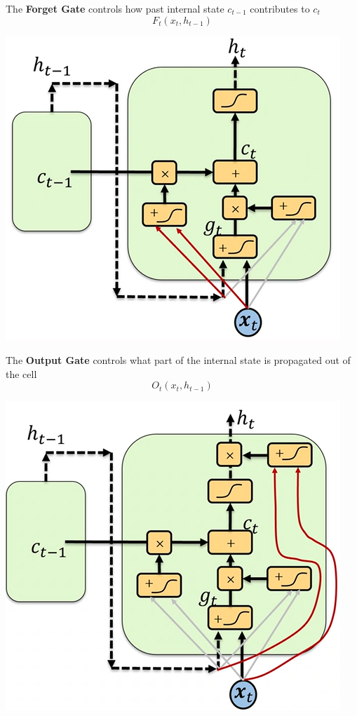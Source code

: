 \documentclass[10pt]{report}
\begin{document}
The \textbf{Forget Gate} controls how past internal state $c_{t-1}$ contributes to $c_t$ $$F_t(x_t,h_{t-1})$$
\begin{center}
	\includegraphics[scale=0.33]{96.png}
\end{center}
The \textbf{Output Gate} controls what part of the internal state is propagated out of the cell $$O_t(x_t,h_{t-1})$$
\begin{center}
	\includegraphics[scale=0.5]{97.png}
\end{center}
\end{document}

